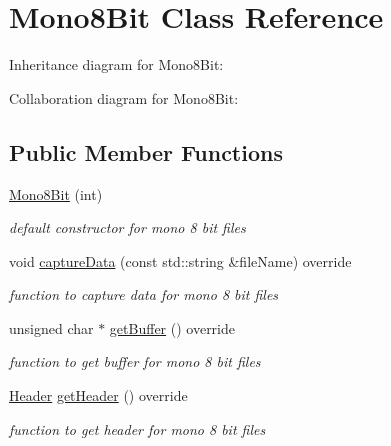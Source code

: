 \hypertarget{classMono8Bit}{}\section{Mono8\+Bit Class Reference}
\label{classMono8Bit}


Inheritance diagram for Mono8\+Bit\+:


Collaboration diagram for Mono8\+Bit\+:
\subsection*{Public Member Functions}
\begin{DoxyCompactItemize}
\item 
\mbox{\label{classMono8Bit_a33e92a9190186b570b0d23fe237cdbb3}} 
\hyperlink{classMono8Bit_a33e92a9190186b570b0d23fe237cdbb3}{Mono8\+Bit} (int)
\begin{DoxyCompactList}\small\item\em default constructor for mono 8 bit files \end{DoxyCompactList}\item 
void \hyperlink{classMono8Bit_a87631b77782bb49ae04b24560d6bcc1f}{capture\+Data} (const std\+::string \&file\+Name) override
\begin{DoxyCompactList}\small\item\em function to capture data for mono 8 bit files \end{DoxyCompactList}\item 
\mbox{\label{classMono8Bit_a8619f45777a3dede9d142210139576c1}} 
unsigned char $\ast$ \hyperlink{classMono8Bit_a8619f45777a3dede9d142210139576c1}{get\+Buffer} () override
\begin{DoxyCompactList}\small\item\em function to get buffer for mono 8 bit files \end{DoxyCompactList}\item 
\mbox{\label{classMono8Bit_aa67d57067791bdfff19569291aa3539a}} 
\hyperlink{structHeader}{Header} \hyperlink{classMono8Bit_aa67d57067791bdfff19569291aa3539a}{get\+Header} () override
\begin{DoxyCompactList}\small\item\em function to get header for mono 8 bit files \end{DoxyCompactList}\item 

\end{DoxyCompactItemize}

